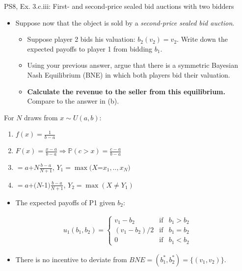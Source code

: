 \begin{frame}{PS8, Ex. 3.c.iii: First- and second-price sealed bid auctions with two bidders}
    \begin{multicols}{2}
      \begin{itemize}
        \item[(c)] Suppose now that the object is sold by a \textit{second-price sealed bid auction}.
        \begin{itemize}\normalsize
          \item[i.]   Suppose player 2 bids his valuation: $b_2(v_2) = v_2$. Write down the expected payoffs to player 1 from bidding $b_1$.
          \item[ii.]  Using your previous answer, argue that there is a symmetric Bayesian Nash Equilibrium (BNE) in which both players bid their valuation.
          \item[iii.] \textbf{Calculate the revenue to the seller from this equilibrium.} Compare to the answer in (b).
        \end{itemize}
      \end{itemize}
      For $N$ draws from $x\sim U(a, b):$
      \vspace{-6pt}
      \begin{enumerate}
        \item[PDF:] $f(x)=\frac{1}{b-a}$
        \item[CDF:] $F(x)=\frac{x-a}{b-a}\Rightarrow\mathbb{P}(c>x)=\frac{c-a}{b-a}$
        \item[$\mathbb{E}(Y_1)$] $=a$+$N\frac{b-a}{N+1}$, $Y_1=\max(X$=$x_1,..,x_N)$
        \item[$\mathbb{E}(Y_2)$] $=a$+$(N$-1$)\frac{b-a}{N+1}$, $Y_2=\max(X\neq Y_1)$
      \end{enumerate}
      \vfill\null\columnbreak
      \begin{itemize}
        \item[(i)] The expected payoffs of P1 given $b_2$:
      \end{itemize}
      \vspace{-16pt}
      \begin{align*}
        u_1(b_1,b_2)=\left\{\begin{array}{lcl}
          v_1-b_2     & \text{if} & b_1>b_2 \\
          (v_1-b_2)/2 & \text{if} & b_1=b_2 \\
          0           & \text{if} & b_1<b_2
        \end{array}\right.
      \end{align*}
      \vspace{-18pt}
      \begin{itemize}
        \item[(ii)] There is no incentive to deviate from $BNE=(b_1^*,b_2^*)=\{(v_1,v_2)\}$.
      \end{itemize}
      \vfill\null
    \end{multicols}
\end{frame}
